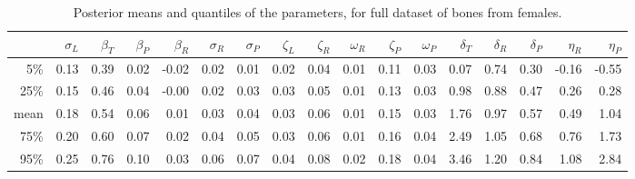 \documentclass{article}
\begin{document}
\begin{table}[ht]
    \footnotesize
\centering
\begin{tabular}{rrrrrrrrrrrrrrrrr}
  \hline
        &  $\sigma_L$  &  $\beta_T$  &  $\beta_P$  &  $\beta_R$  &  $\sigma_R$  &  $\sigma_P$  &  $\zeta_L$  &  $\zeta_R$  &  $\omega_R$  &  $\zeta_P$  &  $\omega_P$  &  $\delta_T$  &  $\delta_R$  &  $\delta_P$  &  $\eta_R$  &  $\eta_P$  \\
\hline
5\%     &  0.13        &  0.39       &  0.02       &  -0.02      &  0.02        &  0.01        &  0.02       &  0.04       &  0.01        &  0.11       &  0.03        &  0.07        &  0.74        &  0.30        &  -0.16     &  -0.55     \\
25\%    &  0.15        &  0.46       &  0.04       &  -0.00      &  0.02        &  0.03        &  0.03       &  0.05       &  0.01        &  0.13       &  0.03        &  0.98        &  0.88        &  0.47        &  0.26      &  0.28      \\
mean    &  0.18        &  0.54       &  0.06       &  0.01       &  0.03        &  0.04        &  0.03       &  0.06       &  0.01        &  0.15       &  0.03        &  1.76        &  0.97        &  0.57        &  0.49      &  1.04      \\
75\%    &  0.20        &  0.60       &  0.07       &  0.02       &  0.04        &  0.05        &  0.03       &  0.06       &  0.01        &  0.16       &  0.04        &  2.49        &  1.05        &  0.68        &  0.76      &  1.73      \\
95\%    &  0.25        &  0.76       &  0.10       &  0.03       &  0.06        &  0.07        &  0.04       &  0.08       &  0.02        &  0.18       &  0.04        &  3.46        &  1.20        &  0.84        &  1.08      &  2.84      \\
   \hline
\end{tabular}
\caption{ \label{tab:females_posterior_distrns} Posterior means and quantiles of the parameters, for full dataset of bones from females.  }
\end{table}
\end{document}
